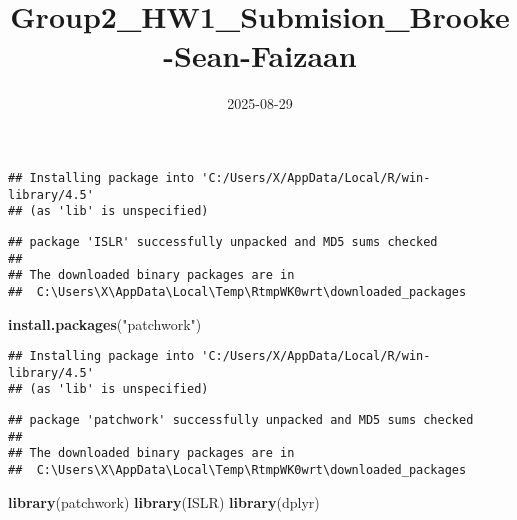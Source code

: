 \documentclass[
]{article}
\title{Group2\_HW1\_Submision\_Brooke-Sean-Faizaan}
\author{}
\date{\vspace{-2.5em}2025-08-29}
\newenvironment{Shaded}{\begin{snugshade}}{\end{snugshade}}
\newcommand{\AttributeTok}[1]{\textcolor[rgb]{0.13,0.29,0.53}{#1}}
\newcommand{\CommentTok}[1]{\textcolor[rgb]{0.56,0.35,0.01}{\textit{#1}}}
\newcommand{\FunctionTok}[1]{\textcolor[rgb]{0.13,0.29,0.53}{\textbf{#1}}}
\newcommand{\NormalTok}[1]{#1}
\newcommand{\StringTok}[1]{\textcolor[rgb]{0.31,0.60,0.02}{#1}}
\begin{document}
\maketitle

\begin{Shaded}
\end{Shaded}

\begin{verbatim}
## Installing package into 'C:/Users/X/AppData/Local/R/win-library/4.5'
## (as 'lib' is unspecified)
\end{verbatim}

\begin{verbatim}
## package 'ISLR' successfully unpacked and MD5 sums checked
## 
## The downloaded binary packages are in
##  C:\Users\X\AppData\Local\Temp\RtmpWK0wrt\downloaded_packages
\end{verbatim}

\begin{Shaded}
\begin{Highlighting}[]
\FunctionTok{install.packages}\NormalTok{(}\StringTok{"patchwork"}\NormalTok{)}
\end{Highlighting}
\end{Shaded}

\begin{verbatim}
## Installing package into 'C:/Users/X/AppData/Local/R/win-library/4.5'
## (as 'lib' is unspecified)
\end{verbatim}

\begin{verbatim}
## package 'patchwork' successfully unpacked and MD5 sums checked
## 
## The downloaded binary packages are in
##  C:\Users\X\AppData\Local\Temp\RtmpWK0wrt\downloaded_packages
\end{verbatim}

\begin{Shaded}
\begin{Highlighting}[]
\FunctionTok{library}\NormalTok{(patchwork)}
\FunctionTok{library}\NormalTok{(ISLR)}
\FunctionTok{library}\NormalTok{(dplyr)}
\end{Highlighting}
\end{Shaded}
\end{document}
